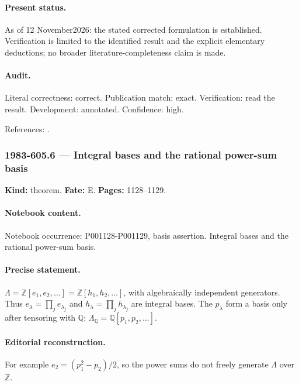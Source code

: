 \paragraph{Present status.} As of 12 November2026: the stated corrected formulation is established. Verification is limited to the identified result and the explicit elementary deductions; no broader literature-completeness claim is made.

\paragraph{Audit.} Literal correctness: correct. Publication match: exact. Verification: read the result. Development: annotated. Confidence: high.

\noindent References: \citep{macdonald1995symmetric}.\par

\subsubsection{1983-605.6 --- Integral bases and the rational power-sum basis}

\label{item:1983-605.6}

\noindent\textbf{Kind:} theorem. \textbf{Fate:} E. \textbf{Pages:} 1128--1129.\par

\paragraph{Notebook content.} Notebook occurrence: P001128-P001129, basis assertion. Integral bases and the rational power-sum basis.

\paragraph{Precise statement.} \(\Lambda=\mathbb Z[e_1,e_2,\ldots]=\mathbb Z[h_1,h_2,\ldots]\), with algebraically independent generators. Thus \(e_\lambda=\prod_j e_{\lambda_j}\) and \(h_\lambda=\prod_j h_{\lambda_j}\) are integral bases. The \(p_\lambda\) form a basis only after tensoring with \(\mathbb Q\): \(\Lambda_{\mathbb Q}=\mathbb Q[p_1,p_2,\ldots]\).

\paragraph{Editorial reconstruction.} For example \(e_2=(p_1^2-p_2)/2\), so the power sums do not freely generate \(\Lambda\) over \(\mathbb Z\).

